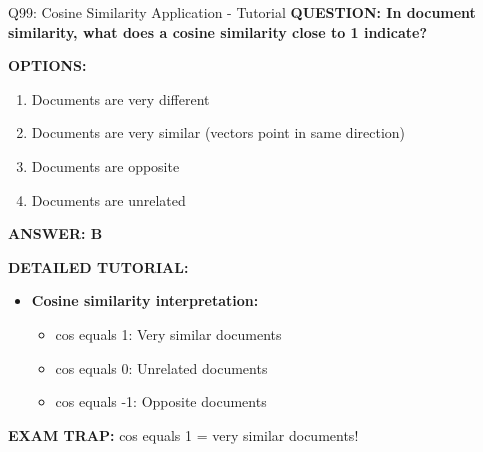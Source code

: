 \documentclass[8pt]{beamer}
\begin{document}
	\begin{frame}{Q99: Cosine Similarity Application - Tutorial}
		\fontsize{6.5}{7.5}\selectfont
		\textbf{QUESTION: In document similarity, what does a cosine similarity close to 1 indicate?}
		
		\vspace{0.1cm}
		\textbf{OPTIONS:}
		\begin{enumerate}
			\item Documents are very different
			\item Documents are very similar (vectors point in same direction)
			\item Documents are opposite
			\item Documents are unrelated
		\end{enumerate}
		
		\vspace{0.1cm}
		\textcolor{myblue}{\textbf{ANSWER: B}}
		
		\vspace{0.1cm}
		\textbf{DETAILED TUTORIAL:}
		\begin{itemize}
			\item \textbf{Cosine similarity interpretation:}
			\begin{itemize}
				\item cos equals 1: Very similar documents
				\item cos equals 0: Unrelated documents
				\item cos equals -1: Opposite documents
			\end{itemize}
		\end{itemize}
		
		\textcolor{myred}{\textbf{EXAM TRAP:}} cos equals 1 = \textcolor{myblue}{very similar documents}!
	\end{frame}
	
\end{document}
